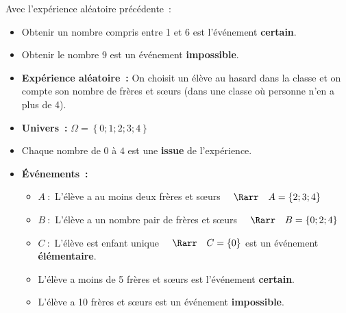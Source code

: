 \begin{ex}
	Avec l'expérience aléatoire précédente~:
	\begin{itemize}
		\item \og Obtenir un nombre compris entre 1 et 6 \fg{} est l'événement \textbf{certain}.
		\item \og Obtenir le nombre 9 \fg{} est un événement \textbf{impossible}.
	\end{itemize}
\end{ex}

\begin{ex}
	\nline
	\begin{itemize}
		\item \textbf{Expérience aléatoire~:} \og On choisit un élève au hasard dans la classe et on compte son nombre de frères et s\oe{}urs \fg{} (dans une classe où personne n'en a plus de 4).
		\item \textbf{Univers~:} $\Omega = \left\{ 0 ; 1 ; 2 ; 3 ; 4 \right\}$
		\item Chaque nombre de $0$ à $4$ est une \textbf{issue} de l'expérience.
		\item \textbf{Événements~:}
		      \begin{itemize}
			      \item $A~:$ \og L'élève a au moins deux frères et s\oe{}urs \fg{} $\quad\Rarr\quad A = \left\{ 2 ; 3 ; 4 \right\}$
			      \item $B~:$ \og L'élève a un nombre pair de frères et s\oe{}urs \fg{} $\quad\Rarr\quad B = \left\{ 0 ; 2 ; 4 \right\}$
			      \item $C~:$ \og L'élève est enfant unique \fg{} $\quad\Rarr\quad C = \left\{ 0 \right\}$ est un événement \textbf{élémentaire}.
			      \item \og L'élève a moins de 5 frères et s\oe{}urs \fg{} est l'événement \textbf{certain}.
			      \item \og L'élève a 10 frères et s\oe{}urs \fg{} est un événement \textbf{impossible}.
		      \end{itemize}
	\end{itemize}
\end{ex}

